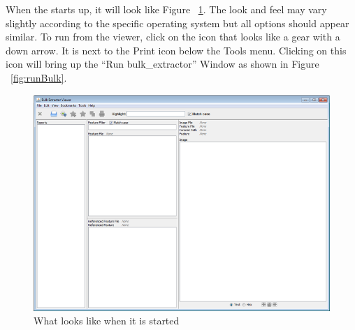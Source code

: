 \documentclass[11pt]{article} %
\begin{document}
When the \viewer starts up, it will look like Figure ~\ref{fig:startup}. The look and feel may vary slightly according to the specific operating system but all options should appear similar. To run \bulk from the viewer, click on the icon that looks like a gear with a down arrow. It is next to the Print icon below the Tools menu. Clicking on this icon will bring up the ``Run bulk\_extractor'' Window as shown in Figure ~\ref{fig:runBulk}.\\
\begin{figure}
	\center
	\includegraphics[scale=.8]{viewerPics/startup.png}
	\caption{What \viewer looks like when it is started}
	\label{fig:startup}
\end{figure}
\end{document}
